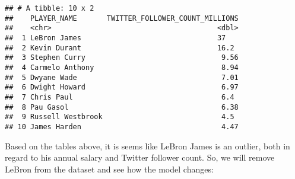 \documentclass[]{article}
\newenvironment{Shaded}{\begin{snugshade}}{\end{snugshade}}
\newcommand{\KeywordTok}[1]{\textcolor[rgb]{0.13,0.29,0.53}{\textbf{#1}}}
\newcommand{\NormalTok}[1]{#1}
\newcommand{\OperatorTok}[1]{\textcolor[rgb]{0.81,0.36,0.00}{\textbf{#1}}}
\newcommand{\StringTok}[1]{\textcolor[rgb]{0.31,0.60,0.02}{#1}}
\begin{document}
\begin{verbatim}
## # A tibble: 10 x 2
##    PLAYER_NAME       TWITTER_FOLLOWER_COUNT_MILLIONS
##    <chr>                                       <dbl>
##  1 LeBron James                                37   
##  2 Kevin Durant                                16.2 
##  3 Stephen Curry                                9.56
##  4 Carmelo Anthony                              8.94
##  5 Dwyane Wade                                  7.01
##  6 Dwight Howard                                6.97
##  7 Chris Paul                                   6.4 
##  8 Pau Gasol                                    6.38
##  9 Russell Westbrook                            4.5 
## 10 James Harden                                 4.47
\end{verbatim}

Based on the tables above, it is seems like LeBron James is an outlier,
both in regard to his annual salary and Twitter follower count. So, we
will remove LeBron from the dataset and see how the model changes:

\begin{Shaded}
\end{Shaded}
\end{document}
